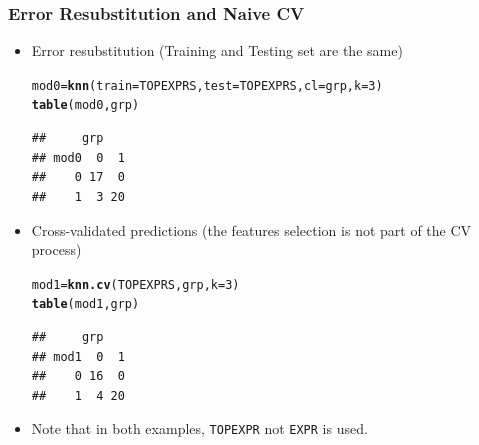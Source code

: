 \documentclass[xcolor=x11names,compress]{beamer}\usepackage[]{graphicx}\usepackage[]{color}
\makeatletter
\newcommand{\hlnum}[1]{\textcolor[rgb]{0.686,0.059,0.569}{#1}}%
\newcommand{\hlstd}[1]{\textcolor[rgb]{0.345,0.345,0.345}{#1}}%
\newcommand{\hlkwb}[1]{\textcolor[rgb]{0.69,0.353,0.396}{#1}}%
\newcommand{\hlkwc}[1]{\textcolor[rgb]{0.333,0.667,0.333}{#1}}%
\newcommand{\hlkwd}[1]{\textcolor[rgb]{0.737,0.353,0.396}{\textbf{#1}}}%
\newenvironment{kframe}{%
 \def\at@end@of@kframe{}%
 \ifinner\ifhmode%
  \def\at@end@of@kframe{\end{minipage}}%
  \begin{minipage}{\columnwidth}%
 \fi\fi%
 \def\FrameCommand##1{\hskip\@totalleftmargin \hskip-\fboxsep
 \colorbox{shadecolor}{##1}\hskip-\fboxsep
     \hskip-\linewidth \hskip-\@totalleftmargin \hskip\columnwidth}%
 \MakeFramed {\advance\hsize-\width
   \@totalleftmargin\z@ \linewidth\hsize
   \@setminipage}}%
 {\par\unskip\endMakeFramed%
 \at@end@of@kframe}
\newenvironment{knitrout}{}{} %
\makeatother
\begin{document}
\begin{frame}[containsverbatim]
  \frametitle{Error Resubstitution and Naive CV}
  \footnotesize
  \begin{itemize}
\item Error resubstitution (Training and Testing set are the same)
\begin{knitrout}\tiny
{}\color{fgcolor}\begin{kframe}
\begin{alltt}
\hlstd{mod0}\hlkwb{=}\hlkwd{knn}\hlstd{(}\hlkwc{train}\hlstd{=TOPEXPRS,}\hlkwc{test}\hlstd{=TOPEXPRS,}\hlkwc{cl}\hlstd{=grp,}\hlkwc{k}\hlstd{=}\hlnum{3}\hlstd{)}
\hlkwd{table}\hlstd{(mod0,grp)}
\end{alltt}
\begin{verbatim}
##     grp
## mod0  0  1
##    0 17  0
##    1  3 20
\end{verbatim}
\end{kframe}
\end{knitrout}
\item Cross-validated predictions (the features selection
      is not part of the CV process)
\begin{knitrout}\tiny
{}\color{fgcolor}\begin{kframe}
\begin{alltt}
\hlstd{mod1}\hlkwb{=}\hlkwd{knn.cv}\hlstd{(TOPEXPRS,grp,}\hlkwc{k}\hlstd{=}\hlnum{3}\hlstd{)}
\hlkwd{table}\hlstd{(mod1,grp)}
\end{alltt}
\begin{verbatim}
##     grp
## mod1  0  1
##    0 16  0
##    1  4 20
\end{verbatim}
\end{kframe}
\end{knitrout}
\item Note that in both examples, {\tt TOPEXPR} not {\tt EXPR}
  is used.
\end{itemize}
  
  
\end{frame}
\end{document}
